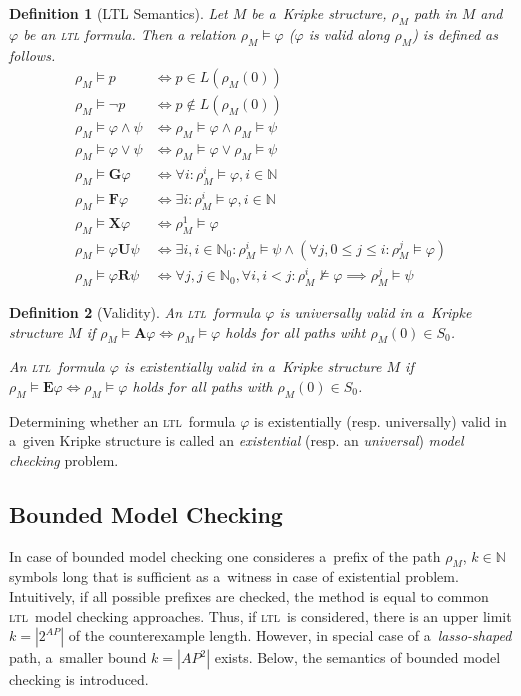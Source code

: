 \documentclass[12pt,oneside,draft]{fithesis}
\newcommand{\ltl}{\textsc{ltl}~}
\newcommand{\mNatural}{\mathbb{N}}
\newcommand{\bF}{\mathbf{F}}
\newcommand{\bG}{\mathbf{G}}
\newcommand{\bX}{\mathbf{X}}
\newcommand{\bU}{\mathbf{U}}
\newcommand{\bR}{\mathbf{R}}
\newcommand{\bA}{\mathbf{A}}
\newcommand{\bE}{\mathbf{E}}
\newtheorem{mydef}{Definition}
\begin{document}
\begin{mydef}[LTL Semantics]
Let $M$ be a~Kripke structure, $\rho_M$ path in $M$ and $\varphi$ be
an \textsc{ltl} formula. Then a relation $\rho_M\models\varphi$
($\varphi$ is valid along $\rho_M$) is defined as follows\cite{clarke}.
\begin{align}
	\rho_M\models p&\iff p\in L(\rho_M(0))\\
	\rho_M\models\neg p&\iff p\notin L(\rho_M(0))\\
	\rho_M\models \varphi\wedge\psi&\iff\rho_M\models\varphi\wedge
		\rho_M\models\psi\\
	\rho_M\models \varphi\vee\psi&\iff\rho_M\models\varphi\vee
		\rho_M\models\psi\\
	\rho_M\models\bG\varphi&\iff\forall i:\rho_M^i\models\varphi,
		i\in\mNatural\\
	\rho_M\models\bF\varphi&\iff\exists i:\rho_M^i\models\varphi,
		i\in\mNatural\\
	\rho_M\models\bX\varphi&\iff\rho_M^1\models\varphi\\
	\rho_M\models\varphi\bU\psi&\iff\exists i,i\in\mNatural_0:
		\rho_M^i\models\psi\wedge(\forall j,0\leq j\leq i:
			\rho_M^j\models\varphi)\\
	\rho_M\models\varphi\bR\psi&\iff\forall j,j\in\mNatural_0,
		\forall i,i<j:\rho_M^i\not\models\varphi\implies
			\rho_M^j\models\psi
\end{align}
\end{mydef}

\begin{mydef}[Validity]
An \ltl formula $\varphi$ is universally valid in a~Kripke structure $M$
if $\rho_M\models\bA\varphi\iff\rho_M\models\varphi$ holds for all
paths wiht $\rho_M(0)\in S_0$.

An \ltl formula $\varphi$ is existentially valid in a~Kripke structure
$M$ if $\rho_M\models\bE\varphi\iff\rho_M\models\varphi$ holds for all
paths with $\rho_M(0)\in S_0$\cite{biere}.
\end{mydef}


Determining whether an \ltl formula $\varphi$ is existentially (resp.
universally) valid in a~given Kripke structure is called an
\emph{existential} (resp. an \emph{universal}) \emph{model checking}
problem\cite{biere}.

\subsection{Bounded Model Checking}
In case of bounded model checking one consideres a~prefix of the path
$\rho_M$, $k\in\mNatural$ symbols long that is sufficient as a~witness
in case of existential problem\cite{biere}. Intuitively, if all
possible prefixes are checked, the method is equal to common \ltl model
checking approaches. Thus, if \ltl is considered, there is an upper
limit $k=|2^{AP}|$ of the counterexample length\cite{biere}. However, in
special case of a~\emph{lasso-shaped} path, a~smaller bound $k=|AP^2|$
exists\cite{biere}. Below, the semantics of bounded model checking is
introduced.
\end{document}
